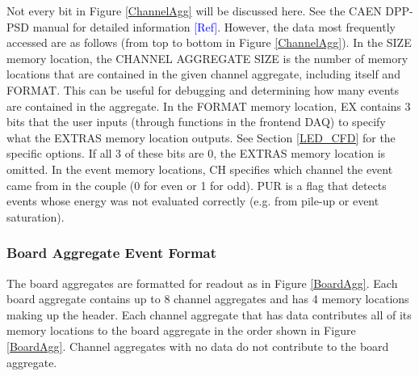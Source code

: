 Not every bit in Figure \ref{ChannelAgg} will be discussed here. See the CAEN DPP-PSD manual for detailed information \textcolor{blue}{[Ref]}. However, the data most frequently accessed are as follows (from top to bottom in Figure \ref{ChannelAgg}). In the SIZE memory location, the CHANNEL AGGREGATE SIZE is the number of memory locations that are contained in the given channel aggregate, including itself and FORMAT. This can be useful for debugging and determining how many events are contained in the aggregate. In the FORMAT memory location, EX contains 3 bits that the user inputs (through functions in the frontend DAQ) to specify what the EXTRAS memory location outputs. See Section \ref{LED_CFD} for the specific options. If all 3 of these bits are 0, the EXTRAS memory location is omitted. In the event memory locations, CH specifies which channel the event came from in the couple (0 for even or 1 for odd). PUR is a flag that detects events whose energy was not evaluated correctly (e.g. from pile-up or event saturation). 



\subsubsection{Board Aggregate Event Format} \label{board_agg}

The board aggregates are formatted for readout as in Figure \ref{BoardAgg}. Each board aggregate contains up to 8 channel aggregates and has 4 memory locations making up the header. Each channel aggregate that has data contributes all of its memory locations to the board aggregate in the order shown in Figure \ref{BoardAgg}. Channel aggregates with no data do not contribute to the board aggregate.

